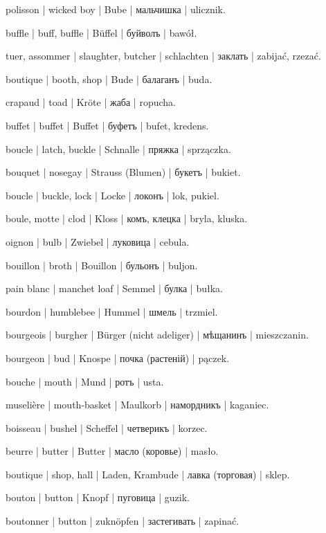\begin{outdent}{1em}
polisson | wicked boy | Bube | мальчишка | ulicznik.

buffle | buff, buffle | Büffel | буйволъ | bawół.

tuer, assommer | slaughter, butcher | schlachten | заклать | zabijać, rzezać.

boutique | booth, shop | Bude | балаганъ | buda.

crapaud | toad | Kröte | жаба | ropucha.

buffet | buffet | Buffet | буфетъ | bufet, kredens.

boucle | latch, buckle | Schnalle | пряжка | sprzączka.

bouquet | nosegay | Strauss (Blumen) | букетъ | bukiet.

boucle | buckle, lock | Locke | локонъ | lok, pukiel.

boule, motte | clod | Kloss | комъ, клецка | bryla, kluska.

oignon | bulb | Zwiebel | луковица | cebula.

bouillon | broth | Bouillon | бульонъ | buljon.

pain blanc | manchet loaf | Semmel | булка | bułka.

bourdon | humblebee | Hummel | шмель | trzmiel.

bourgeois | burgher | Bürger (nicht adeliger) | мѣщанинъ | mieszczanin.

bourgeon | bud | Knospe | почка (растеній) | pączek.

bouche | mouth | Mund | ротъ | usta.

\uvsubentry{}
muselière | mouth-basket | Maulkorb | намордникъ | kaganiec.

boisseau | bushel | Scheffel | четверикъ | korzec.

beurre | butter | Butter | масло (коровье) | masło.

boutique | shop, hall | Laden, Krambude | лавка (торговая) | sklep.

bouton | button | Knopf | пуговица | guzik.

\uvsubentry{}
boutonner | button | zuknöpfen | застегивать | zapinać.


\end{outdent}
